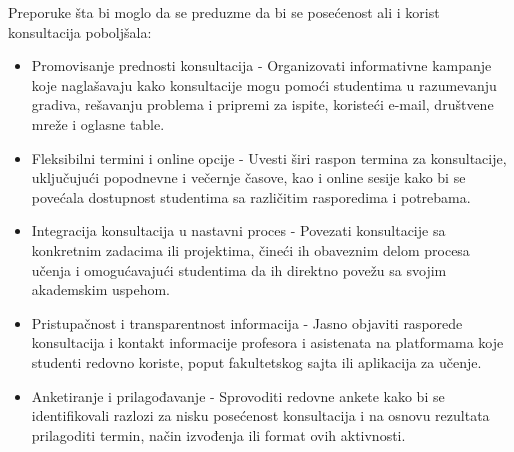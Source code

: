 \documentclass[a4paper]{article}
\begin{document}
Preporuke šta bi moglo da se preduzme da bi se posećenost ali i korist konsultacija poboljšala:\\

\begin{itemize}
    \item Promovisanje prednosti konsultacija - Organizovati informativne kampanje koje naglašavaju kako konsultacije mogu pomoći studentima u razumevanju gradiva, rešavanju problema i pripremi za ispite, koristeći e-mail, društvene mreže i oglasne table.
    \item Fleksibilni termini i online opcije - Uvesti širi raspon termina za konsultacije, uključujući popodnevne i večernje časove, kao i online sesije kako bi se povećala dostupnost studentima sa različitim rasporedima i potrebama.
    \item Integracija konsultacija u nastavni proces - Povezati konsultacije sa konkretnim zadacima ili projektima, čineći ih obaveznim delom procesa učenja i omogućavajući studentima da ih direktno povežu sa svojim akademskim uspehom.
    \item Pristupačnost i transparentnost informacija - Jasno objaviti rasporede konsultacija i kontakt informacije profesora i asistenata na platformama koje studenti redovno koriste, poput fakultetskog sajta ili aplikacija za učenje.
    \item Anketiranje i prilagođavanje - Sprovoditi redovne ankete kako bi se identifikovali razlozi za nisku posećenost konsultacija i na osnovu rezultata prilagoditi termin, način izvođenja ili format ovih aktivnosti.\\

\end{itemize}

\captionsetup[table]{skip=10pt}
\begin{table}[H]
\centering %
\caption{Korisnost konsultacija sa profesorima/asistentima}
\end{table}
\end{document}
